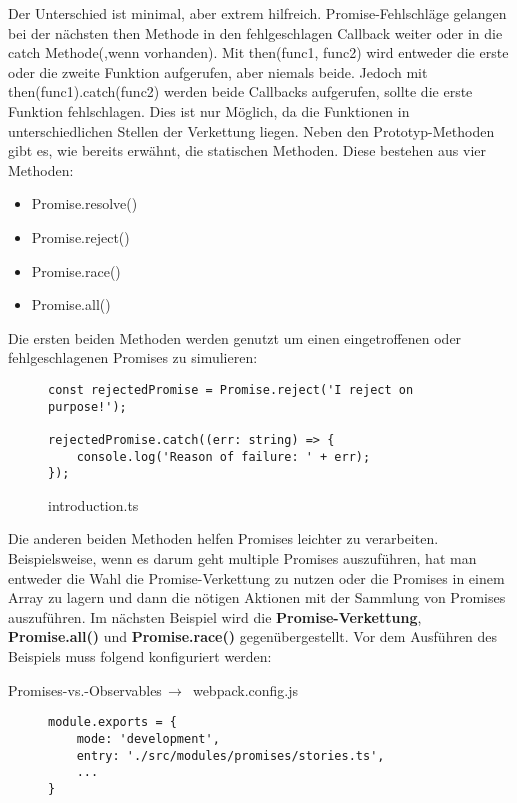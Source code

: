 \noindent
Der Unterschied ist minimal, aber extrem hilfreich. Promise-Fehlschläge gelangen bei der nächsten then Methode in den fehlgeschlagen Callback weiter oder in die catch Methode(,wenn vorhanden). Mit then(func1, func2) wird entweder die erste oder die zweite Funktion aufgerufen, aber niemals beide. Jedoch mit then(func1).catch(func2) werden beide Callbacks aufgerufen, sollte die erste Funktion fehlschlagen. Dies ist nur Möglich, da die Funktionen in unterschiedlichen Stellen der Verkettung liegen. Neben den Prototyp-Methoden gibt es, wie bereits erwähnt, die statischen Methoden. Diese bestehen aus vier Methoden:

\begin{itemize}
\item Promise.resolve()
\item Promise.reject()
\item Promise.race()
\item Promise.all()
\end{itemize}

\noindent
Die ersten beiden Methoden werden genutzt um einen eingetroffenen oder fehlgeschlagenen Promises zu simulieren:

\begin{figure}[H]
\begin{lstlisting}
const rejectedPromise = Promise.reject('I reject on purpose!');

rejectedPromise.catch((err: string) => {
    console.log('Reason of failure: ' + err);
});
\end{lstlisting}
\caption{introduction.ts}
\end{figure}

\noindent
Die anderen beiden Methoden helfen Promises leichter zu verarbeiten. Beispielsweise, wenn es darum geht multiple Promises auszuführen, hat man entweder die Wahl die Promise-Verkettung zu nutzen oder die Promises in einem Array zu lagern und dann die nötigen Aktionen mit der Sammlung von Promises auszuführen. Im nächsten Beispiel wird die \textbf{Promise-Verkettung}, \textbf{Promise.all()} und \textbf{Promise.race()} gegenübergestellt. Vor dem Ausführen des Beispiels muss folgend konfiguriert werden:

 \begin{center}
     Promises-vs.-Observables$\,\to\,$ webpack.config.js
 \end{center}

\begin{figure}[H]
\begin{lstlisting}
module.exports = {
    mode: 'development',
    entry: './src/modules/promises/stories.ts',
    ...
}
\end{lstlisting}
\end{figure}


